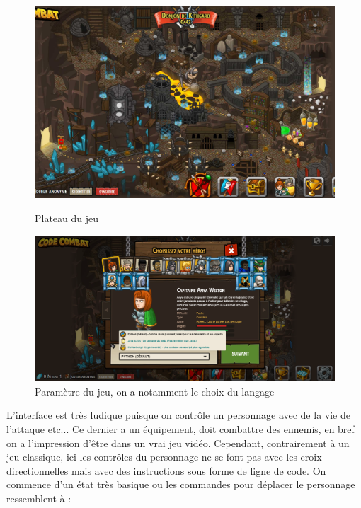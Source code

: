 \begin{figure}[!htb]
  \centering
  \begin{minipage}[b]{0.48\textwidth}
    \includegraphics[width=\textwidth]{images/codecombat1.PNG}
    \caption{Plateau du jeu}
  \end{minipage}
  \hfill
  \begin{minipage}[b]{0.48\textwidth}
    \includegraphics[width=\textwidth]{images/codecombat2.png}
    \caption{Paramètre du jeu, on a notamment le choix du langage}
  \end{minipage}
\end{figure}

L'interface est très ludique puisque on contrôle un personnage avec de la vie de l'attaque etc... Ce dernier a un équipement, doit combattre des ennemis, en bref on a l'impression d'être dans un vrai jeu vidéo. Cependant, contrairement à un jeu classique, ici les contrôles du personnage ne se font pas avec les croix directionnelles mais avec des instructions sous forme de ligne de code. On commence d'un état très basique ou les commandes pour déplacer le personnage ressemblent à : 

